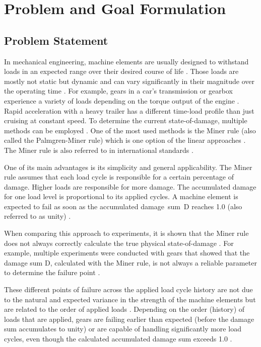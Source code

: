 \section{Problem and Goal Formulation}
\subsection{Problem Statement}\label{prob}

In mechanical engineering, machine elements are usually designed to withstand loads in an expected range over their desired course of life \cite{Vietze}. Those loads are mostly not static but dynamic and can vary significantly in their magnitude over the operating time \cite{Wittel}. For example, gears in a car's transmission or gearbox experience a variety of loads depending on the torque output of the engine \cite{Yuksel}. Rapid acceleration with a heavy trailer has a different time-load profile than just cruising at constant speed.
\newpage
To determine the current state-of-damage, multiple methods can be employed \cite{Lee}. One of the most used methods is the Miner rule \cite{MinerOG} (also called the Palmgren-Miner rule) which is one option of the linear approaches \cite{Sun}. The Miner rule is also referred to in international standards \cite{ISO1}.

One of its main advantages is its simplicity and general applicability. The Miner rule assumes that each load cycle is responsible for a certain percentage of damage. Higher loads are responsible for more damage. The accumulated damage for one load level is proportional to its applied cycles. A machine element is expected to fail as soon as the accumulated damage~sum~D reaches 1.0 (also referred to as unity) \cite{ISO1, Miller}.

When comparing this approach to experiments, it is shown that the Miner rule does not always correctly calculate the true physical state-of-damage \cite{Pavlou}. For example, multiple experiments were conducted with gears that showed that the damage sum D, calculated with the Miner rule, is not always a reliable parameter to determine the failure point \cite{Hanumanna}.

These different points of failure across the applied load cycle history are not due to the natural and expected variance in the strength of the machine elements but are related to the order of applied loads \cite{Skorupa}. Depending on the order (history) of loads that are applied, gears are failing earlier than expected (before the damage sum accumulates to unity) or are capable of handling significantly more load cycles, even though the calculated accumulated damage sum exceeds 1.0 \cite{Hanumanna}.

